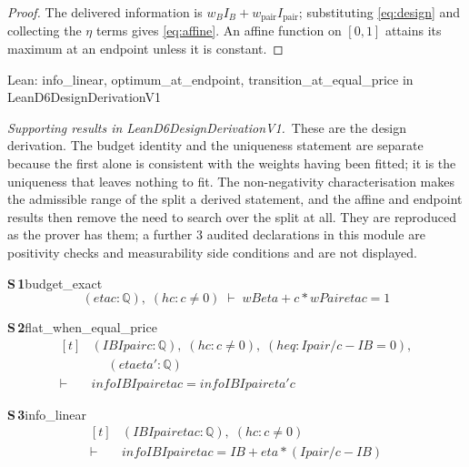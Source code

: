 \documentclass[conference]{IEEEtran}
\theoremstyle{definition}
\newcommand{\lean}[1]{\textsf{\footnotesize #1}}
\newcommand{\leanbox}[1]{%
  \par\vspace{2pt}\noindent
  {\footnotesize\textsf{Lean: #1}}\par\vspace{2pt}}
\begin{document}
\begin{proof}
The delivered information is $w_{B}I_{B}+w_{\mathrm{pair}}I_{\mathrm{pair}}$; substituting
\eqref{eq:design} and collecting the $\eta$ terms gives \eqref{eq:affine}. An affine function
on $[0,1]$ attains its maximum at an endpoint unless it is constant.
\end{proof}

\leanbox{\lean{info\_linear}, \lean{optimum\_at\_endpoint},
\lean{transition\_at\_equal\_price} in \lean{LeanD6DesignDerivationV1}}

\noindent\emph{Supporting results in \lean{LeanD6DesignDerivationV1}.}~These are the design derivation. The budget identity and the uniqueness statement are separate because the first alone is consistent with the weights having been fitted; it is the uniqueness that leaves nothing to fit. The non-negativity characterisation makes the admissible range of the split a derived statement, and the affine and endpoint results then remove the need to search over the split at all. They are reproduced as the prover has them; a further $3$ audited declarations in this module are positivity checks and measurability side conditions and are not displayed.

\noindent\textbf{S\,1}\quad\lean{budget\_exact}
{\footnotesize\[ (\mathit{eta} \mathit{c} : \mathbb{Q} ),\; (\mathit{hc} : \mathit{c} \neq 0) \;\vdash\; \mathit{wB} \mathit{eta} + \mathit{c} * \mathit{wPair} \mathit{eta} \mathit{c} = 1 \]}

\noindent\textbf{S\,2}\quad\lean{flat\_when\_equal\_price}
{\footnotesize\[ \begin{aligned}[t]
&(\mathit{IB} \mathit{Ipair} \mathit{c} : \mathbb{Q} ),\; (\mathit{hc} : \mathit{c} \neq 0),\; (\mathit{heq} : \mathit{Ipair} / \mathit{c} - \mathit{IB} = 0),\\
&\quad \; (\mathit{eta} \mathit{eta'} : \mathbb{Q} )\\
\vdash\;&\mathit{info} \mathit{IB} \mathit{Ipair} \mathit{eta} \mathit{c} = \mathit{info} \mathit{IB} \mathit{Ipair} \mathit{eta'} \mathit{c}
\end{aligned} \]}

\noindent\textbf{S\,3}\quad\lean{info\_linear}
{\footnotesize\[ \begin{aligned}[t]
&(\mathit{IB} \mathit{Ipair} \mathit{eta} \mathit{c} : \mathbb{Q} ),\; (\mathit{hc} : \mathit{c} \neq 0)\\
\vdash\;&\mathit{info} \mathit{IB} \mathit{Ipair} \mathit{eta} \mathit{c} = \mathit{IB} + \mathit{eta} * (\mathit{Ipair} / \mathit{c} - \mathit{IB})
\end{aligned} \]}
\end{document}
